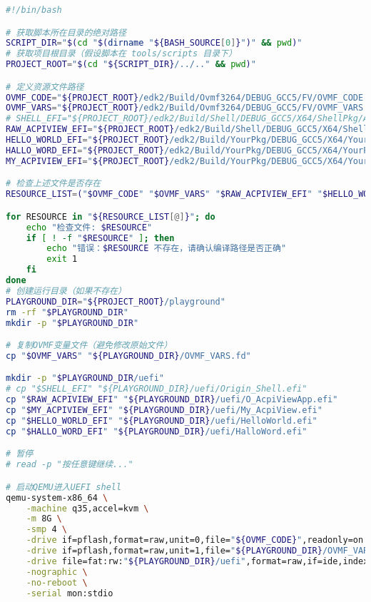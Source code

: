 \begin{lstlisting}[language=bash]
#!/bin/bash

# 获取脚本所在目录的绝对路径
SCRIPT_DIR="$(cd "$(dirname "${BASH_SOURCE[0]}")" && pwd)"
# 获取项目根目录（假设脚本在 tools/scripts 目录下）
PROJECT_ROOT="$(cd "${SCRIPT_DIR}/../.." && pwd)"

# 定义资源文件路径
OVMF_CODE="${PROJECT_ROOT}/edk2/Build/Ovmf3264/DEBUG_GCC5/FV/OVMF_CODE.fd"
OVMF_VARS="${PROJECT_ROOT}/edk2/Build/Ovmf3264/DEBUG_GCC5/FV/OVMF_VARS.fd"
# SHELL_EFI="${PROJECT_ROOT}/edk2/Build/Shell/DEBUG_GCC5/X64/ShellPkg/Application/Shell/EA4BB293-2D7F-4456-A681-1F22F42CD0BC/DEBUG/Shell.efi"
RAW_ACPIVIEW_EFI="${PROJECT_ROOT}/edk2/Build/Shell/DEBUG_GCC5/X64/ShellPkg/Application/AcpiViewApp/AcpiViewApp/DEBUG/AcpiViewApp.efi"
HELLO_WORLD_EFI="${PROJECT_ROOT}/edk2/Build/YourPkg/DEBUG_GCC5/X64/YourPkg/Application/HelloWorld/HelloWorld/DEBUG/HelloWorld.efi"
HALLO_WORD_EFI="${PROJECT_ROOT}/edk2/Build/YourPkg/DEBUG_GCC5/X64/YourPkg/Application/HalloWord/HalloWord/DEBUG/HalloWord.efi"
MY_ACPIVIEW_EFI="${PROJECT_ROOT}/edk2/Build/YourPkg/DEBUG_GCC5/X64/YourPkg/Application/AcpiView/AcpiView/DEBUG/AcpiView.efi"

# 检查上述文件是否存在
RESOURCE_LIST=("$OVMF_CODE" "$OVMF_VARS" "$RAW_ACPIVIEW_EFI" "$HELLO_WORLD_EFI" "$HALLO_WORD_EFI" "$MY_ACPIVIEW_EFI")

for RESOURCE in "${RESOURCE_LIST[@]}"; do
	echo "检查文件: $RESOURCE"
	if [ ! -f "$RESOURCE" ]; then
		echo "错误：$RESOURCE 不存在，请确认编译路径是否正确"
		exit 1
	fi
done
# 创建运行目录（如果不存在）
PLAYGROUND_DIR="${PROJECT_ROOT}/playground"
rm -rf "$PLAYGROUND_DIR"
mkdir -p "$PLAYGROUND_DIR"

# 复制OVMF变量文件（避免修改原始文件）
cp "$OVMF_VARS" "${PLAYGROUND_DIR}/OVMF_VARS.fd"

mkdir -p "$PLAYGROUND_DIR/uefi"
# cp "$SHELL_EFI" "${PLAYGROUND_DIR}/uefi/Origin_Shell.efi"
cp "$RAW_ACPIVIEW_EFI" "${PLAYGROUND_DIR}/uefi/O_AcpiViewApp.efi"
cp "$MY_ACPIVIEW_EFI" "${PLAYGROUND_DIR}/uefi/My_AcpiView.efi"
cp "$HELLO_WORLD_EFI" "${PLAYGROUND_DIR}/uefi/HelloWorld.efi"
cp "$HALLO_WORD_EFI" "${PLAYGROUND_DIR}/uefi/HalloWord.efi"

# 暂停
# read -p "按任意键继续..."

# 启动QEMU进入UEFI shell
qemu-system-x86_64 \
	-machine q35,accel=kvm \
	-m 8G \
	-smp 4 \
	-drive if=pflash,format=raw,unit=0,file="${OVMF_CODE}",readonly=on \
	-drive if=pflash,format=raw,unit=1,file="${PLAYGROUND_DIR}/OVMF_VARS.fd" \
	-drive file=fat:rw:"${PLAYGROUND_DIR}/uefi",format=raw,if=ide,index=0 \
	-nographic \
	-no-reboot \
	-serial mon:stdio

\end{lstlisting}


